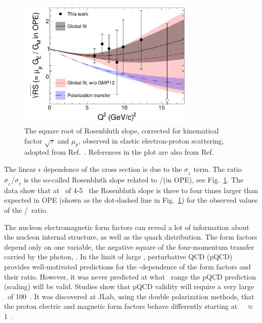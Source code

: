 \begin{figure}[!h]
  \includegraphics[width = 0.75\textwidth]{Plots/Fig1-final.png}
\caption{The square root of Rosenbluth slope, corrected for kinematical factor $\sqrt {\tau}$ and $\mu_p$, observed in elastic electron-proton scattering,
adopted from Ref.~\cite{Christy2020ab}. References in the plot are also from Ref.~\cite{Christy2020ab}}
\label{pic:Fig1}
\end{figure}

The linear $\epsilon$ dependence of the cross section is due to the $\sigma_{_L}$ term. %
The ratio $\sigma_{_L}/\sigma_{_T}$ is the so-called Rosenbluth slope related to \gef/\gmf (in OPE), see Fig.~\ref{pic:Fig1}.
The data show that at \qsq~of 4-5 \gevcsq~the Rosenbluth slope is three to four times larger than expected in OPE (shown as the dot-dashed line in Fig.~\ref{pic:Fig1}) for the observed values of the \gep/\gmp~ratio.

%
The nucleon electromagnetic form factors can reveal a lot of information about the nucleon internal structure, as well as the quark distribution. 
The form factors depend only on one variable, the negative square of the four-momentum transfer carried by the photon, \qsq. 
In the limit of large \qsq, perturbative QCD (pQCD) provides well-motivated predictions for the \qsq-dependence of the form factors and their ratio. 
However, it was never predicted at what \qsq~range the pQCD prediction (scaling) will be valid.
Studies show that pQCD validity will require a very large \qsq~of 100~\gevcsq.
It was discovered at JLab, using the double polarization methods, that the proton electric and magnetic form factors behave differently starting at \qsq~ $\approx$ 1~\gevcsq.
 
